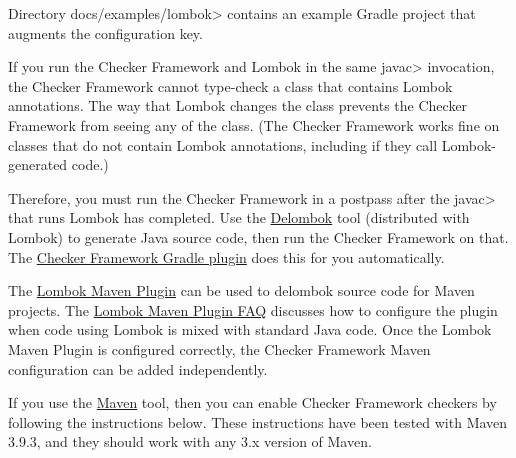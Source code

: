 Directory \<docs/examples/lombok> contains an example Gradle project that
augments the configuration key.





If you run the Checker Framework and Lombok in the same \<javac>
invocation, the Checker Framework cannot type-check a class that contains
Lombok annotations.  The way that Lombok changes the class prevents the
Checker Framework from seeing any of the class.  (The Checker Framework
works fine on classes that do not contain Lombok annotations, including if
they call Lombok-generated code.)

Therefore, you must run the Checker Framework in a postpass after the
\<javac> that runs Lombok has completed.  Use the
\href{https://projectlombok.org/features/delombok}{Delombok} tool
(distributed with Lombok) to generate Java source code, then run the
Checker Framework on that.  The
\href{https://github.com/typetools/checker-framework-gradle-plugin}{Checker
  Framework Gradle plugin} does this for you automatically.



The \href{https://anthonywhitford.com/lombok.maven/lombok-maven-plugin/}{Lombok Maven Plugin}
can be used to delombok source code for Maven projects. The
\href{https://anthonywhitford.com/lombok.maven/lombok-maven-plugin/faq.html#alt-src-setup}
{Lombok Maven Plugin FAQ} discusses how to configure the plugin when code
using Lombok is mixed with standard Java code. Once the Lombok Maven Plugin
is configured correctly, the Checker Framework Maven configuration can be added
independently.



If you use the \href{https://maven.apache.org/}{Maven} tool,
then you can enable Checker Framework checkers by following the
instructions below.  These instructions have been tested with
Maven 3.9.3, and they should work with any 3.x version of Maven.


